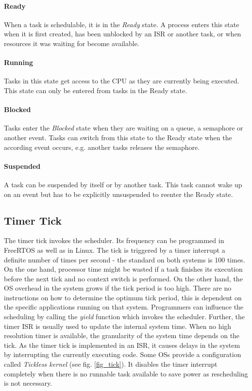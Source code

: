 \paragraph{Ready}
When a task is schedulable, it is in the \textit{Ready} state.  
A process enters this state when it is first created, has been unblocked by an \ac{ISR} or another task, or when resources it was waiting for become available.

\paragraph{Running}
Tasks in this state get access to the \ac{CPU} as they are currently being executed.
This state can only be entered from tasks in the Ready state.

\paragraph{Blocked}
Tasks enter the \textit{Blocked} state when they are waiting on a queue, a semaphore or another event.
Tasks can switch from this state to the Ready state when the according event occurs, e.g. another tasks releases the semaphore.

\paragraph{Suspended}
A task can be suspended by itself or by another task. 
This task cannot wake up on an event but has to be explicitly unsuspended to reenter the Ready state.  

\subsection{Timer Tick}\label{ss_timer_tick}
The timer tick invokes the scheduler.
Its frequency can be programmed in FreeRTOS as well as in Linux.
The tick is triggered by a timer interrupt a definite number of times per second - the standard on both systems is 100 times. 
On the one hand, processor time might be wasted if a task finishes its execution before the next tick and no context switch is performed.
On the other hand, the \ac{OS} overhead in the system grows if the tick period is too high.
There are no instructions on how to determine the optimum tick period, this is dependent on the specific applications running on that system. 
Programmers can influence the scheduling by calling the \textit{yield} function which invokes the scheduler.
Further, the timer \ac{ISR} is usually used to update the internal system time. 
When no high resolution timer is available, the granularity of the system time depends on the tick.
As the timer tick is implemented in an \ac{ISR}, it causes delays in the system by interrupting the currently executing code. 
Some \acp{OS} provide a configuration called \textit{Tickless kernel} (see fig. \ref{fig_tick}).
It disables the timer interrupt completely when there is no runnable task available to save power as rescheduling is not necessary.

